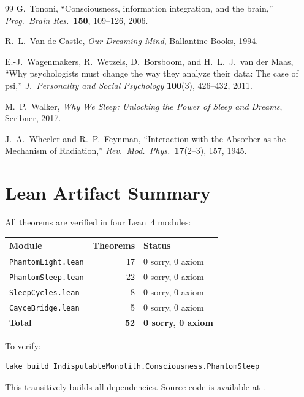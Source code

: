 \documentclass[11pt, a4paper]{article}
\theoremstyle{definition}
\theoremstyle{remark}
\begin{document}
\begin{thebibliography}{99}
G.~Tononi,
``Consciousness, information integration, and the brain,''
\textit{Prog.\ Brain Res.}\ \textbf{150}, 109--126, 2006.

R.~L.~Van de Castle,
\textit{Our Dreaming Mind},
Ballantine Books, 1994.

E.-J.~Wagenmakers, R.~Wetzels, D.~Borsboom, and
H.~L.~J.~van der Maas,
``Why psychologists must change the way they analyze their data:
The case of psi,''
\textit{J.\ Personality and Social Psychology} \textbf{100}(3),
426--432, 2011.

M.~P.~Walker,
\textit{Why We Sleep: Unlocking the Power of Sleep and Dreams},
Scribner, 2017.

J.~A.~Wheeler and R.~P.~Feynman,
``Interaction with the Absorber as the Mechanism of Radiation,''
\textit{Rev.\ Mod.\ Phys.}\ \textbf{17}(2--3), 157, 1945.

\end{thebibliography}


\appendix

\section{Lean Artifact Summary}\label{app:lean}

All theorems are verified in four Lean~4 modules:

\begin{center}
\small
\begin{tabular}{lrl}
\toprule
\textbf{Module} & \textbf{Theorems} & \textbf{Status} \\
\midrule
\texttt{PhantomLight.lean} & 17 & 0 sorry, 0 axiom \\
\texttt{PhantomSleep.lean} & 22 & 0 sorry, 0 axiom \\
\texttt{SleepCycles.lean} & 8 & 0 sorry, 0 axiom \\
\texttt{CayceBridge.lean} & 5 & 0 sorry, 0 axiom \\
\midrule
\textbf{Total} & \textbf{52} & \textbf{0 sorry, 0 axiom} \\
\bottomrule
\end{tabular}
\end{center}

To verify:
\begin{verbatim}
lake build IndisputableMonolith.Consciousness.PhantomSleep
\end{verbatim}
This transitively builds all dependencies. Source code is available
at \cite{RSLeanRepo}.
\end{document}
